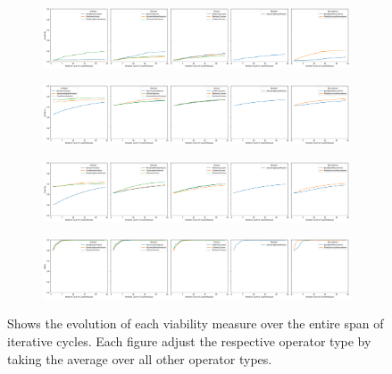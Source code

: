 \documentclass[./../../paper.tex]{subfiles}
\begin{document}
\begin{figure}[htbp]
    \centering
    \begin{subfigure}[c]{0.9\textwidth}
        \centering
        \includegraphics[width=\textwidth]{figures/generated/exp1_feasibility.png}
        \label{fig:exp1-feasibility}    
    \end{subfigure}
    \hfill
    \begin{subfigure}[c]{0.9\textwidth}
        \centering
        \includegraphics[width=\textwidth]{figures/generated/exp1_similarity.png}
        \label{fig:exp1-similarity}
    \end{subfigure}
    \hfill
    \begin{subfigure}[c]{0.9\textwidth}
        \centering
        \includegraphics[width=\textwidth]{figures/generated/exp1_sparcity.png}
        \label{fig:exp1-sparcity}
    \end{subfigure}
    \hfill
    \begin{subfigure}[c]{0.9\textwidth}
        \centering
        \includegraphics[width=\textwidth]{figures/generated/exp1_delta.png}
        \label{fig:exp1-delta}
    \end{subfigure}
    \caption{Shows the evolution of each viability measure over the entire span of iterative cycles. Each figure adjust the respective operator type by taking the average over all other operator types. }
    \label{fig:exp1-measure}
    
\end{figure}
\end{document}
